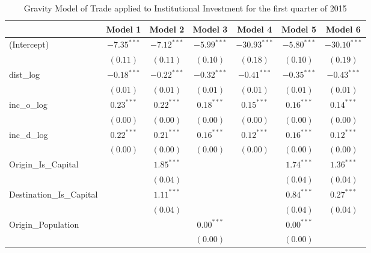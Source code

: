 \begin{table}
	\begin{center}
		\small
		\caption[Gravity Model of trade for Q1 2015]{Gravity Model of Trade applied to Institutional Investment for the first quarter of 2015}
		\begin{tabular}{l c c c c c c }
			\hline
			& Model 1 & Model 2 & Model 3 & Model 4 & Model 5 & Model 6 \\
			\hline
			(Intercept)                  & $-7.35^{***}$ & $-7.12^{***}$ & $-5.99^{***}$ & $-30.93^{***}$ & $-5.80^{***}$ & $-30.10^{***}$ \\
			& $(0.11)$      & $(0.11)$      & $(0.10)$      & $(0.18)$       & $(0.10)$      & $(0.19)$       \\
			dist\_log                    & $-0.18^{***}$ & $-0.22^{***}$ & $-0.32^{***}$ & $-0.41^{***}$  & $-0.35^{***}$ & $-0.43^{***}$  \\
			& $(0.01)$      & $(0.01)$      & $(0.01)$      & $(0.01)$       & $(0.01)$      & $(0.01)$       \\
			inc\_o\_log                  & $0.23^{***}$  & $0.22^{***}$  & $0.18^{***}$  & $0.15^{***}$   & $0.16^{***}$  & $0.14^{***}$   \\
			& $(0.00)$      & $(0.00)$      & $(0.00)$      & $(0.00)$       & $(0.00)$      & $(0.00)$       \\
			inc\_d\_log                  & $0.22^{***}$  & $0.21^{***}$  & $0.16^{***}$  & $0.12^{***}$   & $0.16^{***}$  & $0.12^{***}$   \\
			& $(0.00)$      & $(0.00)$      & $(0.00)$      & $(0.00)$       & $(0.00)$      & $(0.00)$       \\
			Origin\_Is\_Capital          &               & $1.85^{***}$  &               &                & $1.74^{***}$  & $1.36^{***}$   \\
			&               & $(0.04)$      &               &                & $(0.04)$      & $(0.04)$       \\
			Destination\_Is\_Capital     &               & $1.11^{***}$  &               &                & $0.84^{***}$  & $0.27^{***}$   \\
			&               & $(0.04)$      &               &                & $(0.04)$      & $(0.04)$       \\
			Origin\_Population           &               &               & $0.00^{***}$  &                & $0.00^{***}$  &                \\
			&               &               & $(0.00)$      &                & $(0.00)$      &                \\

\end{tabular}
\end{center}
\end{table}
